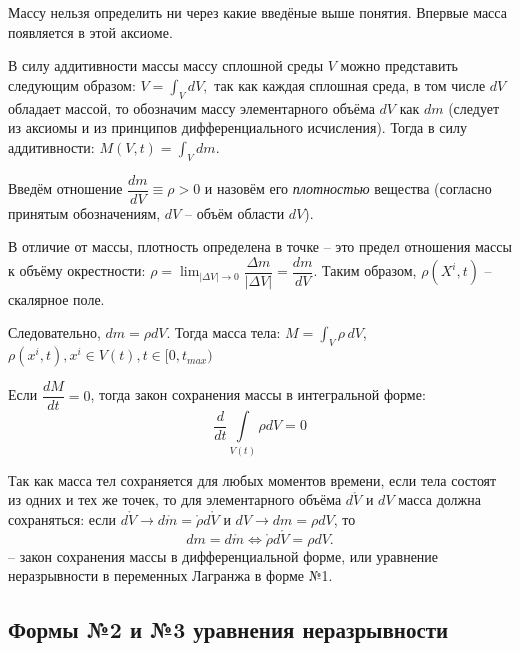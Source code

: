 Массу нельзя определить ни через какие введёные выше понятия. Впервые масса появляется
в этой аксиоме.


\begin{corollary}
  В силу аддитивности массы массу сплошной среды $V$ можно представить следующим образом:
  $V = \int_V dV,$ так как каждая сплошная среда, в том числе $dV$ обладает
  массой, то обозначим массу элементарного объёма $dV$ как $dm$ (следует из аксиомы и из
  принципов дифференциального исчисления). Тогда в силу аддитивности:
  $M(V, t) = \int_V dm$.
\end{corollary}

\begin{definition}
  Введём отношение $ \dfrac{dm}{dV} \equiv \rho > 0$ и назовём его \emph{плотностью}
  вещества (согласно принятым обозначениям, $dV$ -- объём области $dV$).

  В отличие от массы, плотность определена в точке -- это предел отношения
  массы к объёму окрестности: $\rho = \lim_{|\Delta V| \to 0} \dfrac{\Delta m}{|\Delta V|} = \dfrac{dm}{dV}$.
  Таким образом, $\rho(X^i, t)$ -- скалярное поле.
\end{definition}

\begin{corollary}
  Следовательно, $dm = \rho dV$. Тогда масса тела: $M = \int_V \rho \, dV$, $\rho(x^i, t), x^i \in V(t), t\in[0, t_{max})$
\end{corollary}

Если $ \dfrac{dM}{dt} = 0 $, тогда закон сохранения массы в интегральной форме:
\[
  \dfrac{d}{dt} \int\limits_{V(t)} \rho dV = 0
\]

\begin{corollary}
  Так как масса тел сохраняется для любых моментов времени, если тела состоят 
  из одних и тех же точек, то для элементарного объёма $d\mathring{V}$ и $dV$
  масса должна сохраняться: если $d\mathring{V} \to d\mathring{m} = \mathring{\rho} d\mathring{V}$
  и $dV \to dm = \rho dV$, то
  \begin{equation}\label{lec_6:eq_lagrange_1form}
    dm = d\mathring{m} \Leftrightarrow
    \mathring{\rho} d\mathring{V} = \rho dV.
  \end{equation}
  -- закон сохранения массы в дифференциальной форме, или уравнение неразрывности в 
  переменных Лагранжа в форме №1.
\end{corollary}



\subsection{Формы №2 и №3 уравнения неразрывности}

